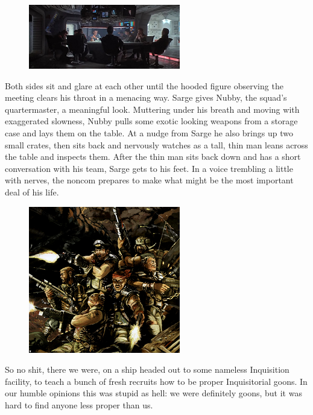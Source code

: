 \begin{figure}
	\begin{center}
		\includegraphics[width=\figwidth]{pics/8/2.png}
	\end{center}
\end{figure}
Both sides sit and glare at each other until the hooded figure observing the meeting clears his throat in a menacing way. 
Sarge gives Nubby, the squad’s quartermaster, a meaningful look. 
Muttering under his breath and moving with exaggerated slowness, Nubby pulls some exotic looking weapons from a storage case and lays them on the table. 
At a nudge from Sarge he also brings up two small crates, then sits back and nervously watches as a tall, thin man leans across the table and inspects them. 
After the thin man sits back down and has a short conversation with his team, Sarge gets to his feet. 
In a voice trembling a little with nerves, the noncom prepares to make what might be the most important deal of his life.




\begin{figure}
	\begin{center}
		\includegraphics[width=\figwidth]{pics/8/3.png}
	\end{center}
\end{figure}
So no shit, there we were, on a ship headed out to some nameless Inquisition facility, to teach a bunch of fresh recruits how to be proper Inquisitorial goons. 
In our humble opinions this was stupid as hell: 
we were definitely goons, but it was hard to find anyone less proper than us.

